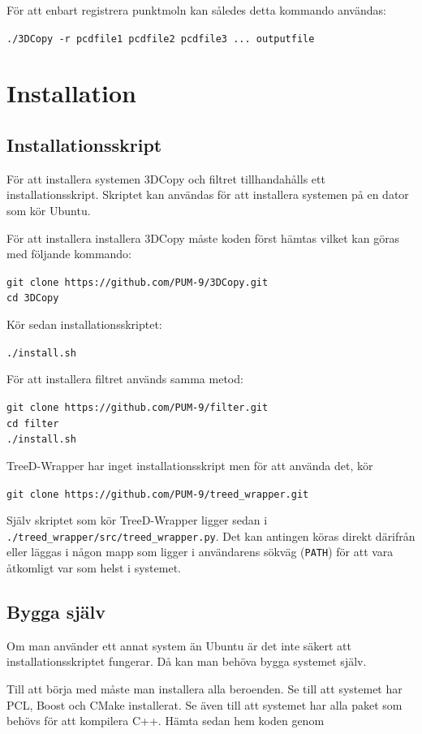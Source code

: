 \documentclass[a4paper,titlepage,12pt]{article}
\begin{document}
		För att enbart registrera punktmoln kan således detta kommando användas:
		
		\texttt{./3DCopy -r pcdfile1 pcdfile2 pcdfile3 ... outputfile}
\newpage
   
    
\section{Installation}
\subsection{Installationsskript}
	För att installera systemen 3DCopy och filtret tillhandahålls ett installationsskript. Skriptet kan användas för att installera systemen på en dator som kör Ubuntu.
	
	För att installera installera 3DCopy måste koden först hämtas vilket kan göras med följande kommando:
	
	\texttt{git clone https://github.com/PUM-9/3DCopy.git \\
	cd 3DCopy}
	
	Kör sedan installationsskriptet:
	
	\texttt{./install.sh}
	
	För att installera filtret används samma metod:
	
	\texttt{git clone https://github.com/PUM-9/filter.git \\
	cd filter \\
	./install.sh}
	
	TreeD-Wrapper har inget installationsskript men för att använda det, kör
	
	\texttt{git clone https://github.com/PUM-9/treed\_wrapper.git}
	
	Själv skriptet som kör TreeD-Wrapper ligger sedan i \texttt{./treed\_wrapper/src/treed\_wrapper.py}. Det kan antingen köras direkt därifrån eller läggas i någon mapp som ligger i användarens sökväg (\texttt{PATH}) för att vara åtkomligt var som helst i systemet.
	
\subsection{Bygga själv}
	Om man använder ett annat system än Ubuntu är det inte säkert att installationsskriptet fungerar. Då kan man behöva bygga systemet själv.
	
	Till att börja med måste man installera alla beroenden. Se till att systemet har PCL, Boost och CMake installerat. Se även till att systemet har alla paket som behövs för att kompilera C++. Hämta sedan hem koden genom
	
\end{document}
